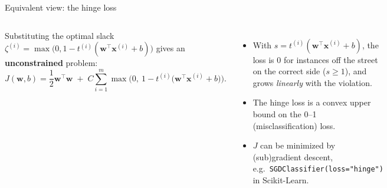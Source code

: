 \documentclass[aspectratio=169,10pt]{beamer}
\newcommand{\w}{\mathbf{w}}
\newcommand{\x}{\mathbf{x}}
\begin{document}
\begin{frame}{Equivalent view: the hinge loss}
\begin{columns}[c]
\centering
{}
\small
Substituting the optimal slack $\zeta^{(i)}=\max\big(0,1-t^{(i)}(\w^\top\x^{(i)}+b)\big)$ gives an \textbf{unconstrained} problem:
\[
  J(\w,b) = \frac12\w^\top\w \;+\; C\sum_{i=1}^{m}\max\!\Big(0,\ 1-t^{(i)}\big(\w^\top\x^{(i)}+b\big)\Big).
\]
\begin{itemize}
  \item With $s=t^{(i)}(\w^\top\x^{(i)}+b)$, the loss is $0$ for instances off the street on the correct side ($s\ge1$), and grows \emph{linearly} with the violation.
  \item The hinge loss is a convex upper bound on the 0--1 (misclassification) loss.
  \item $J$ can be minimized by (sub)gradient descent, e.g.\ \texttt{SGDClassifier(loss="hinge")} in Scikit-Learn.
\end{itemize}
\end{columns}
\end{frame}
\end{document}
